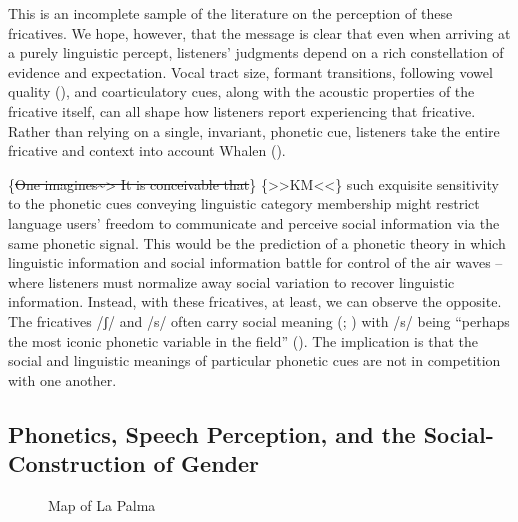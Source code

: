 \documentclass[
  man,
  longtable,
  nolmodern,
  notxfonts,
  notimes,
  colorlinks=true,linkcolor=blue,citecolor=blue,urlcolor=blue]{apa7}
\begin{document}
This is an incomplete sample of the literature on the perception of
these fricatives. We hope, however, that the message is clear that even
when arriving at a purely linguistic percept, listeners' judgments
depend on a rich constellation of evidence and expectation. Vocal tract
size, formant transitions, following vowel quality
(), and coarticulatory
cues, along with the acoustic properties of the fricative itself, can
all shape how listeners report experiencing that fricative. Rather than
relying on a single, invariant, phonetic cue, listeners take the entire
fricative and context into account Whalen
().

\{\st{One imagines\textasciitilde\textgreater{} It is conceivable
that}\} \{\textgreater\textgreater KM\textless\textless\} such exquisite
sensitivity to the phonetic cues conveying linguistic category
membership might restrict language users' freedom to communicate and
perceive social information via the same phonetic signal. This would be
the prediction of a phonetic theory in which linguistic information and
social information battle for control of the air waves --where listeners
must normalize away social variation to recover linguistic information.
Instead, with these fricatives, at least, we can observe the opposite.
The fricatives /ʃ/ and /s/ often carry social meaning
(;
) with /s/
being ``perhaps the most iconic phonetic variable in the field''
(). The implication is that the
social and linguistic meanings of particular phonetic cues are not in
competition with one another.

\subsection{Phonetics, Speech Perception, and the Social-Construction of
Gender}\label{phonetics-speech-perception-and-the-social-construction-of-gender}

\begin{figure}

\caption{\label{fig-map}Map of La Palma}


\end{figure}%
\end{document}
